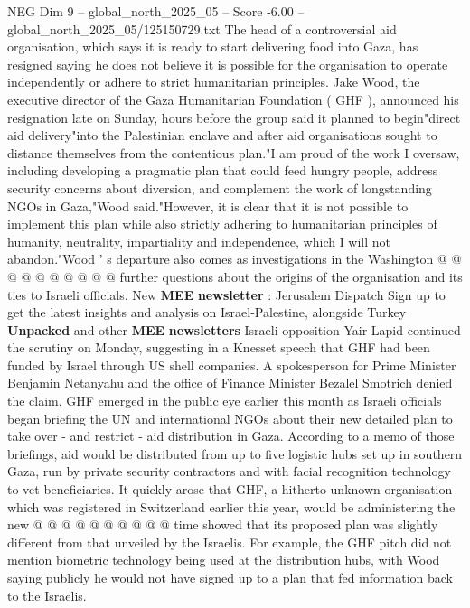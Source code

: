 \begin{textsample}{NEG Dim 9 – global\_north\_2025\_05 – Score -6.00 – global\_north\_2025\_05/125150729.txt}  \label{ex:f9_neg_089}
The head of a controversial aid organisation, which says it is ready to start delivering food into Gaza, has resigned saying he does not believe it is possible for the organisation to operate independently or adhere to strict humanitarian principles.
Jake Wood, the executive director of the Gaza Humanitarian Foundation ( GHF ), announced his resignation late on Sunday, hours before the group said it planned to begin"direct aid delivery"into the Palestinian enclave and after aid organisations sought to distance themselves from the contentious plan."I am proud of the work I oversaw, including developing a pragmatic plan that could feed hungry people, address security concerns about diversion, and complement the work of longstanding NGOs in Gaza,"Wood said."However, it is clear that it is not possible to implement this plan while also strictly adhering to humanitarian principles of humanity, neutrality, impartiality and independence, which I will not abandon."Wood ' s departure also comes as investigations in the Washington @ @ @ @ @ @ @ @ @ @ further questions about the origins of the organisation and its ties to Israeli officials.
New \textbf{MEE} \textbf{newsletter} : Jerusalem Dispatch Sign up to get the latest insights and analysis on Israel-Palestine, alongside Turkey \textbf{Unpacked} and other \textbf{MEE} \textbf{newsletters} Israeli opposition Yair Lapid continued the scrutiny on Monday, suggesting in a Knesset speech that GHF had been funded by Israel through US shell companies.
A spokesperson for Prime Minister Benjamin Netanyahu and the office of Finance Minister Bezalel Smotrich denied the claim.
GHF emerged in the public eye earlier this month as Israeli officials began briefing the UN and international NGOs about their new detailed plan to take over - and restrict - aid distribution in Gaza.
According to a memo of those briefings, aid would be distributed from up to five logistic hubs set up in southern Gaza, run by private security contractors and with facial recognition technology to vet beneficiaries.
It quickly arose that GHF, a hitherto unknown organisation which was registered in Switzerland earlier this year, would be administering the new @ @ @ @ @ @ @ @ @ @ time showed that its proposed plan was slightly different from that unveiled by the Israelis.
For example, the GHF pitch did not mention biometric technology being used at the distribution hubs, with Wood saying publicly he would not have signed up to a plan that fed information back to the Israelis.

\end{textsample}
